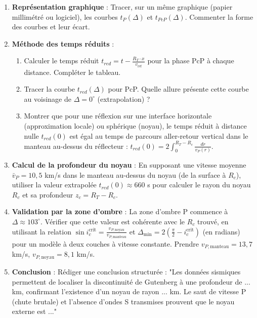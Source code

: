 \documentclass[11pt]{article}
\begin{document}
\begin{exercice}
\begin{enumerate}
    \item \textbf{Représentation graphique} : Tracer, sur un même graphique (papier millimétré ou logiciel), les courbes $t_P(\Delta)$ et $t_{PcP}(\Delta)$. Commenter la forme des courbes et leur écart.
    \item \textbf{Méthode des temps réduits} :
    \begin{enumerate}
        \item Calculer le temps réduit $t_{red} = t - \frac{R_T \cdot x}{v_{\text{ref}}}$ pour la phase PcP à chaque distance. Compléter le tableau.
        \item Tracer la courbe $t_{red}(\Delta)$ pour PcP. Quelle allure présente cette courbe au voisinage de $\Delta = 0^\circ$ (extrapolation) ?
        \item Montrer que pour une réflexion sur une interface horizontale (approximation locale) ou sphérique (noyau), le temps réduit à distance nulle $t_{red}(0)$ est égal au temps de parcours aller-retour vertical dans le manteau au-dessus du réflecteur : $t_{red}(0) = 2 \int_0^{R_T - R_c} \frac{dr}{v_P(r)}$.
    \end{enumerate}
    \item \textbf{Calcul de la profondeur du noyau} :
    En supposant une vitesse moyenne $\bar{v}_P = 10,5$ km/s dans le manteau au-dessus du noyau (de la surface à $R_c$), utiliser la valeur extrapolée $t_{red}(0) \approx 660$ s pour calculer le rayon du noyau $R_c$ et sa profondeur $z_c = R_T - R_c$.
    \item \textbf{Validation par la zone d'ombre} : La zone d'ombre P commence à $\Delta \approx 103^\circ$. Vérifier que cette valeur est cohérente avec le $R_c$ trouvé, en utilisant la relation $\sin i_c^{\text{crit}} = \frac{v_{P,\text{noyau}}}{v_{P,\text{manteau}}}$ et $\Delta_{\min} = 2 \left( \frac{\pi}{2} - i_c^{\text{crit}} \right)$ (en radians) pour un modèle à deux couches à vitesse constante. Prendre $v_{P,\text{manteau}} = 13,7$ km/s, $v_{P,\text{noyau}} = 8,1$ km/s.
    \item \textbf{Conclusion} : Rédiger une conclusion structurée : "Les données sismiques permettent de localiser la discontinuité de Gutenberg à une profondeur de ... km, confirmant l'existence d'un noyau de rayon ... km. Le saut de vitesse P (chute brutale) et l'absence d'ondes S transmises prouvent que le noyau externe est ..."
\end{enumerate}
\end{exercice}
\end{document}
